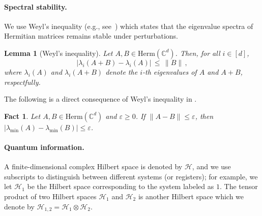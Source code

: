 \documentclass[a4paper,onecolumn,11pt]{quantumarticle}
\theoremstyle{plain}
\newtheorem{lemma}[theorem]{Lemma}
\newtheorem{fact}[theorem]{Fact}
\newcommand{\eps}{\varepsilon}
\begin{document}
\paragraph{Spectral stability.} We use Weyl's inequality (e.g., see~\cite{tao2010eigenvalues}) which states that the eigenvalue spectra of Hermitian matrices remains stable under perturbations.

\begin{lemma}[Weyl's inequality]\label{lem:spectral-stab}
Let $A,B \in \mathrm{Herm}(\mathbb{C}^{d})$. Then, for all $i \in [d]$,
$$
\left|\lambda_i(A+B) - \lambda_i(A) \right| \, \leq \, \|B\| \, ,
$$
where $\lambda_i(A)$ and $\lambda_i(A+B)$ denote the $i$-th eigenvalues of $A$ and $A+B$, respectfully.
\end{lemma}

The following is a direct consequence of Weyl's inequality in .
\begin{fact}\label{fact:weyl-corollary}
Let $A,B \in \mathrm{Herm}(\mathbb{C}^{d})$ and $\eps \geq 0$. If $\|A - B\| \leq \eps$, then $|\lambda_{\mathrm{min}}(A) -\lambda_{\mathrm{min}}(B)| \leq \eps$.
\end{fact}

\paragraph{Quantum information.} 
A finite-dimensional complex Hilbert space is denoted by $\mathcal H$, and we use subscripts to distinguish between different systems (or registers); for example, we let $\mathcal H_{1}$ be the Hilbert space corresponding to the system labeled as $1$. 
The tensor product of two Hilbert spaces $\mathcal H_{1}$ and $\mathcal H_{2}$ is another Hilbert space which we denote by $\mathcal H_{1,2} = \mathcal H_{1} \otimes \mathcal H_{2}$.  
\end{document}
